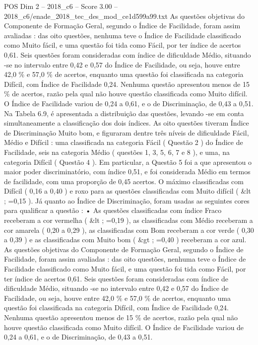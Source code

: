 \begin{textsample}{POS Dim 2 – 2018\_c6 – Score 3.00 – 2018\_c6/enade\_2018\_tec\_des\_mod\_ce1d599a99.txt}
As questões objetivas do Componente de Formação Geral, segundo o Índice de Facilidade, foram assim avaliadas : das oito questões, nenhuma teve o Índice de Facilidade classificado como Muito fácil, e uma questão foi tida como Fácil, por ter índice de acertos 0,61.
Seis questões foram consideradas com índice de dificuldade Médio, situando -se no intervalo entre 0,42 e 0,57 do Índice de Facilidade, ou seja, houve entre 42,0 \% e 57,0 \% de acertos, enquanto uma questão foi classificada na categoria Difícil, com Índice de Facilidade 0,24.
Nenhuma questão apresentou menos de 15 \% de acertos, razão pela qual não houve questão classificada como Muito difícil.
O Índice de Facilidade variou de 0,24 a 0,61, e o de Discriminação, de 0,43 a 0,51.
Na Tabela 6.9, é apresentada a distribuição das questões, levando -se em conta simultaneamente a classificação dos dois índices.
As oito questões tiveram Índice de Discriminação Muito bom, e figuraram dentre três níveis de dificuldade Fácil, Médio e Difícil : uma classificada na categoria Fácil ( Questão 2 ) do Índice de Facilidade, seis na categoria Médio ( questões 1, 3, 5, 6, 7 e 8 ), e uma, na categoria Difícil ( Questão 4 ).
Em particular, a Questão 5 foi a que apresentou o maior poder discriminatório, com índice 0,51, e foi considerada Médio em termos de facilidade, com uma proporção de 0,45 acertos.
O máximo classificadas com Difícil ( 0,16 a 0,40 ) e roxo para as questões classificadas com Muito difícil ( \&lt ; =0,15 ).
Já quanto ao Índice de Discriminação, foram usadas as seguintes cores para qualificar a questão : • As questões classificadas com índice Fraco receberam a cor vermelha ( \&lt ; =0,19 ), as classificadas com Médio receberam a cor amarela ( 0,20 a 0,29 ), as classificadas com Bom receberam a cor verde ( 0,30 a 0,39 ) e as classificadas com Muito bom ( \&gt ; =0,40 ) receberam a cor azul.
As questões objetivas do Componente de Formação Geral, segundo o Índice de Facilidade, foram assim avaliadas : das oito questões, nenhuma teve o Índice de Facilidade classificado como Muito fácil, e uma questão foi tida como Fácil, por ter índice de acertos 0,61.
Seis questões foram consideradas com índice de dificuldade Médio, situando -se no intervalo entre 0,42 e 0,57 do Índice de Facilidade, ou seja, houve entre 42,0 \% e 57,0 \% de acertos, enquanto uma questão foi classificada na categoria Difícil, com Índice de Facilidade 0,24.
Nenhuma questão apresentou menos de 15 \% de acertos, razão pela qual não houve questão classificada como Muito difícil.
O Índice de Facilidade variou de 0,24 a 0,61, e o de Discriminação, de 0,43 a 0,51.

\end{textsample}
